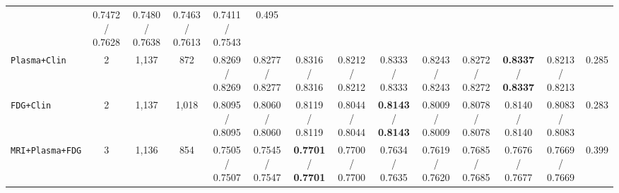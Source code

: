 \documentclass[10pt,twocolumn]{article}
\begin{document}
\begin{table}[t]
{\begin{tabular}{@{}>{\raggedright\arraybackslash}p{2.65cm}ccccccccccccc@{}}
\shortstack{0.7514 /\\0.7646} & \shortstack{0.7472 /\\0.7628} & \shortstack{0.7480 /\\0.7638} &
\shortstack{0.7463 /\\0.7613} & \shortstack{0.7411 /\\0.7543} & 0.495 \\
\texttt{Plasma+Clin} & 2 & 1,137 & 872 & \shortstack{0.8269 /\\0.8269} & \shortstack{0.8277
/\\0.8277} & \shortstack{0.8316 /\\0.8316} & \shortstack{0.8212 /\\0.8212} &
\shortstack{0.8333 /\\0.8333} & \shortstack{0.8243 /\\0.8243} & \shortstack{0.8272 /\\0.8272} &
\shortstack{\textbf{0.8337} /\\\textbf{0.8337}} & \shortstack{0.8213 /\\0.8213} & 0.285 \\
\texttt{FDG+Clin} & 2 & 1,137 & 1,018 & \shortstack{0.8095 /\\0.8095} & \shortstack{0.8060
/\\0.8060} & \shortstack{0.8119 /\\0.8119} & \shortstack{0.8044 /\\0.8044} &
\shortstack{\textbf{0.8143} /\\\textbf{0.8143}} & \shortstack{0.8009 /\\0.8009} &
\shortstack{0.8078 /\\0.8078} & \shortstack{0.8140 /\\0.8140} &
\shortstack{0.8083 /\\0.8083} & 0.283 \\
\midrule
\texttt{MRI+Plasma+FDG} & 3 & 1,136 & 854 & \shortstack{0.7505 /\\0.7507} & \shortstack{0.7545
/\\0.7547} & \shortstack{\textbf{0.7701} /\\\textbf{0.7701}} & \shortstack{0.7700 /\\0.7700} &
\shortstack{0.7634 /\\0.7635} & \shortstack{0.7619 /\\0.7620} & \shortstack{0.7685 /\\0.7685} &
\shortstack{0.7676 /\\0.7677} & \shortstack{0.7669 /\\0.7669} & 0.399 \\

\end{tabular}}
\end{table}
\end{document}
